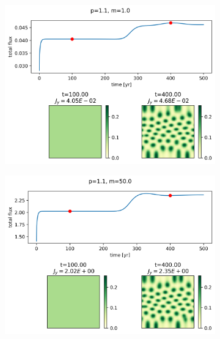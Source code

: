 \documentclass{article}
\numberwithin{equation}{section}
\begin{document}
\begin{figure}[!ht]
    \centering
    \caption{Flux out of the region for various values of $m$.}
    \label{fig:flux_out_slopes}

    \begin{subfigure}[]{0.5\textwidth}
        \centering
        \includegraphics[scale=0.3]{plots/p1_1_m1_0.png}
        \label{fig:m1_0}
    \end{subfigure}

    \begin{subfigure}[]{0.5\textwidth}
        \centering
        \includegraphics[scale=0.5]{plots/p1_1_m50_0.png}
        \label{fig:m50_0}
    \end{subfigure}


\end{figure}
\end{document}

